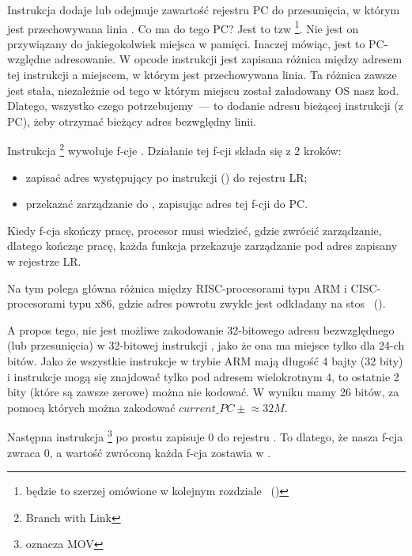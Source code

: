 \myindex{\PICcode}
Instrukcja  dodaje lub odejmuje zawartość rejestru \ac{PC} do przesunięcia, w którym jest przechowywana linia
.
Co ma do tego \ac{PC}? Jest to tzw \q{\PICcode}
\footnote{będzie to szerzej omówione w kolejnym rozdziale ~()}.
Nie jest on przywiązany do jakiegokolwiek miejsca w pamięci.
Inaczej mówiąc, jest to \ac{PC}-względne adresowanie.
W opcode instrukcji  jest zapisana różnica między adresem tej instrukcji a miejscem, w którym jest przechowywana linia.
Ta różnica zawsze jest stała, niezależnie od tego w którym miejscu został załadowany \ac{OS} nasz kod.
Dlatego, wszystko czego potrzebujemy~--- to dodanie adresu bieżącej instrukcji (z \ac{PC}), żeby otrzymać bieżący adres bezwględny linii.

Instrukcja \footnote{Branch with Link} wywołuje f-cje \printf.
Działanie tej f-cji składa się z 2 kroków:

\begin{itemize}
\item zapisać adres występujący po instrukcji  () do rejestru \ac{LR};
\item przekazać zarządzanie do \printf, zapisując adres tej f-cji do \ac{PC}.
\end{itemize}

Kiedy f-cja \printf skończy pracę, procesor musi wiedzieć, gdzie zwrócić zarządzanie, dlatego kończąc pracę, każda funkcja przekazuje zarządzanie pod adres zapisany w rejestrze \ac{LR}.

Na tym polega główna różnica między \ac{RISC}-procesorami typu ARM i \ac{CISC}-procesorami typu x86,
gdzie adres powrotu zwykle jest odkładany na stos ~().

A propos tego,  nie jest możliwe zakodowanie 32-bitowego adresu bezwzględnego (lub przesunięcia) w 32-bitowej instrukcji , jako że ona ma miejsce tylko dla 24-ch bitów.
Jako że wszystkie instrukcje w trybie ARM mają długość 4 bajty (32 bity) i instrukcje mogą się znajdować tylko pod adresem wielokrotnym 4, to ostatnie 2 bity (które są zawsze zerowe) można nie kodować.
W wyniku mamy 26 bitów, za pomocą których można zakodować $current\_PC \pm{} \approx{}32M$.

Następna instrukcja \footnote{oznacza MOV}
po prostu zapisuje 0 do rejestru .
To dlatego, że nasza f-cja zwraca 0, a wartość zwróconą każda f-cja zostawia w .

